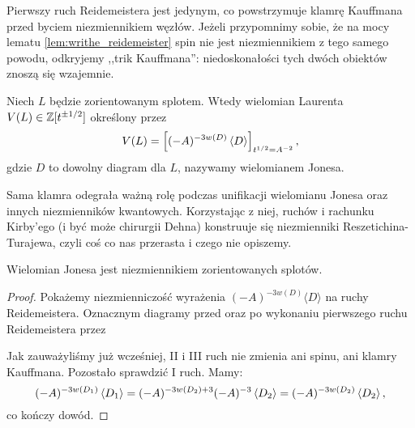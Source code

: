 Pierwszy ruch Reidemeistera jest jedynym, co powstrzymuje klamrę Kauffmana przed byciem niezmiennikiem węzłów.
Jeżeli przypomnimy sobie, że na mocy lematu \ref{lem:writhe_reidemeister} spin nie jest niezmiennikiem z tego samego powodu, odkryjemy ,,trik Kauffmana'': niedoskonałości tych dwóch obiektów znoszą się wzajemnie.
%
%

\begin{definition}
\label{def:jones_polynomial}%
    Niech $L$ będzie zorientowanym splotem.
    Wtedy wielomian Laurenta $V(L) \in \mathbb Z[t^{\pm 1/2}]$ określony przez
    \begin{equation}
        V(L)=\left[(-A)^{-3w(D)} \left\langle{D}\right\rangle\right]_{t^{1/2}=A^{-2}},
    \end{equation}
    gdzie $D$ to dowolny diagram dla $L$, nazywamy wielomianem Jonesa.
\end{definition}

Sama klamra odegrała ważną rolę podczas unifikacji wielomianu Jonesa oraz innych niezmienników kwantowych.
Korzystając z niej, ruchów i rachunku Kirby'ego (i być może chirurgii Dehna) konstruuje się niezmienniki Reszetichina-Turajewa, czyli coś co nas przerasta i czego nie opiszemy.
%
%
%
%
%

\begin{proposition}
    Wielomian Jonesa jest niezmiennikiem zorientowanych splotów.
\end{proposition}

\begin{proof}
    Pokażemy niezmienniczość wyrażenia $(-A)^{-3w(D)}\langle D\rangle$ na ruchy Reidemeistera.
    Oznacznym diagramy przed oraz po wykonaniu pierwszego ruchu Reidemeistera przez
\begin{comment}
    \begin{equation}
        D_1 := \LargeReidemeisterOneLeft,
        \quad\quad\quad
        D_2 := \LargeReidemeisterOneStraight.
    \end{equation}
\end{comment}
    Jak zauważyliśmy już wcześniej, II i III ruch nie zmienia ani spinu, ani klamry Kauffmana.
    Pozostało sprawdzić I ruch.
    Mamy:
    \begin{equation}
        (-A)^{-3 w\left(D_1\right)} \left\langle{D_1}\right\rangle =
        (-A)^{-3 w\left(D_2\right) + 3} (-A)^{-3}\left\langle{D_2}\right\rangle =
        (-A)^{-3 w\left(D_2\right)} \left\langle{D_2}\right\rangle,
    \end{equation}
    co kończy dowód.
\end{proof}

